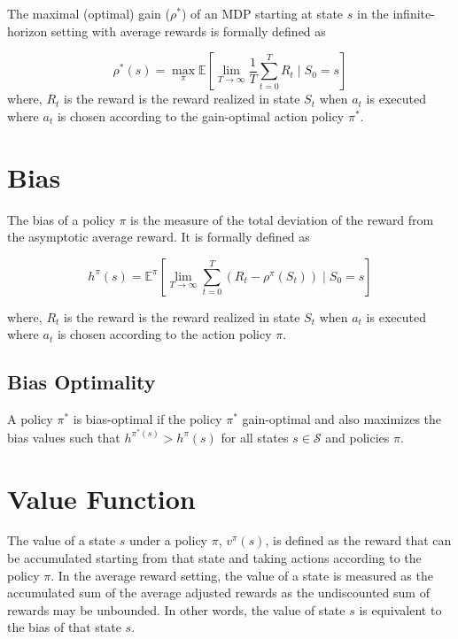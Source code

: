 The maximal (optimal) gain ($\rho^*$) of an MDP starting at state $s$ in the infinite-horizon setting with average rewards is formally defined as

\begin{equation}
    \label{eqn:gain_opt}
    \rho^*(s) = \max_\pi \mathbb{E}\left[\lim_{T \to \infty} \frac{1}{T} \sum_{t=0}^{T} R_t \mid S_0 = s\right]
\end{equation}
where, $R_t$ is the reward is the reward realized in state $S_t$ when $a_t$ is executed where $a_t$ is chosen according to the gain-optimal action policy $\pi^*$.

\section{Bias}

The bias of a policy $\pi$ is the measure of the total deviation of the reward from the asymptotic average reward.
It is formally defined as

\begin{equation}
    \label{eqn:bias}
    h^\pi(s) = \mathbb{E}^\pi\left[\lim_{T \to \infty} \sum_{t=0}^{T} (R_t - \rho^\pi(S_t)) \mid S_0 = s\right]
\end{equation}

where, $R_t$ is the reward is the reward realized in state $S_t$ when $a_t$ is executed where $a_t$ is chosen according to the action policy $\pi$.

\subsection*{Bias Optimality}

A policy $\pi^*$ is bias-optimal if the policy $\pi^*$ gain-optimal and also maximizes the bias values such that $h^{\pi^*(s)} > h^\pi(s)$ for all states $s \in \mathcal{S}$ and policies $\pi$.

\section{Value Function}

The value of a state $s$ under a policy $\pi$, $v^\pi(s)$, is defined as the reward that can be accumulated starting from that state and taking actions according to the policy $\pi$. 
In the average reward setting, the value of a state is measured as the accumulated sum of the average adjusted rewards as the undiscounted sum of rewards may be unbounded.
In other words, the value of state $s$ is equivalent to the bias of that state $s$.

